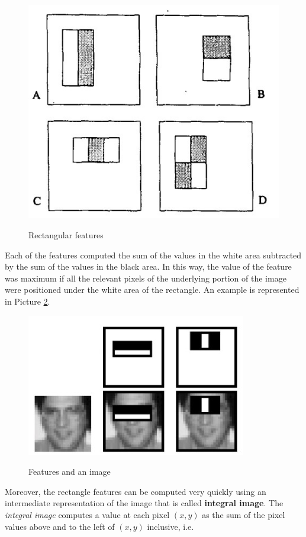 \begin{figure}[h!]
		\centering
		\includegraphics[scale = 1.2]{img/viola_features.jpg}
        \label{viola_features}
        \caption{Rectangular features}
\end{figure}

Each of the features computed the sum of the values in the white area subtracted by the sum of the values in the black area. In this way, the value of the feature was maximum if all the relevant pixels of the underlying portion of the image were positioned under the white area of the rectangle. An example is represented in Picture \ref{viola_features_2}.

\begin{figure}[h!]
		\centering
		\includegraphics[scale = 1.2]{img/viola_features2.jpg}
        \label{viola_features_2}
        \caption{Features and an image}
\end{figure}

Moreover, the rectangle features can be computed very quickly using an intermediate representation of the image that is called \textbf{integral image}. The \textit{integral image} computes a value at each pixel $(x,y)$ as the sum of the pixel values above and to the left of $(x,y)$ inclusive, i.e.

